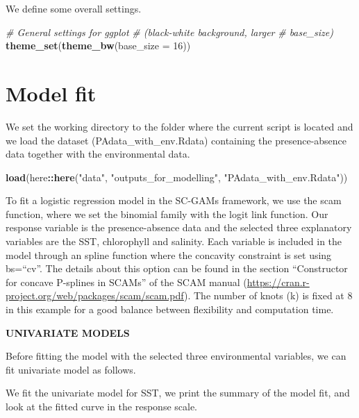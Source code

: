 \documentclass[
]{book}
\newenvironment{Shaded}{\begin{snugshade}}{\end{snugshade}}
\newcommand{\AttributeTok}[1]{\textcolor[rgb]{0.13,0.29,0.53}{#1}}
\newcommand{\CommentTok}[1]{\textcolor[rgb]{0.56,0.35,0.01}{\textit{#1}}}
\newcommand{\DecValTok}[1]{\textcolor[rgb]{0.00,0.00,0.81}{#1}}
\newcommand{\FunctionTok}[1]{\textcolor[rgb]{0.13,0.29,0.53}{\textbf{#1}}}
\newcommand{\NormalTok}[1]{#1}
\newcommand{\SpecialCharTok}[1]{\textcolor[rgb]{0.81,0.36,0.00}{\textbf{#1}}}
\newcommand{\StringTok}[1]{\textcolor[rgb]{0.31,0.60,0.02}{#1}}
\begin{document}
We define some overall settings.

\begin{Shaded}
\begin{Highlighting}[]
\CommentTok{\# General settings for ggplot}
\CommentTok{\# (black{-}white background, larger}
\CommentTok{\# base\_size)}
\FunctionTok{theme\_set}\NormalTok{(}\FunctionTok{theme\_bw}\NormalTok{(}\AttributeTok{base\_size =} \DecValTok{16}\NormalTok{))}
\end{Highlighting}
\end{Shaded}

\section{Model fit}\label{model-fit}

We set the working directory to the folder where the current script is located and we load the dataset (PAdata\_with\_env.Rdata) containing the presence-absence data together with the environmental data.

\begin{Shaded}
\begin{Highlighting}[]
\FunctionTok{load}\NormalTok{(here}\SpecialCharTok{::}\FunctionTok{here}\NormalTok{(}\StringTok{"data"}\NormalTok{, }\StringTok{"outputs\_for\_modelling"}\NormalTok{,}
    \StringTok{"PAdata\_with\_env.Rdata"}\NormalTok{))}
\end{Highlighting}
\end{Shaded}

To fit a logistic regression model in the SC-GAMs framework, we use the scam function, where we set the binomial family with the logit link function. Our response variable is the presence-absence data and the selected three explanatory variables are the SST, chlorophyll and salinity. Each variable is included in the model through an spline function where the concavity constraint is set using bs=``cv''. The details about this option can be found in the section ``Constructor for concave P-splines in SCAMs'' of the SCAM manual (\url{https://cran.r-project.org/web/packages/scam/scam.pdf}). The number of knots (k) is fixed at 8 in this example for a good balance between flexibility and computation time.

\textbf{UNIVARIATE MODELS}

Before fitting the model with the selected three environmental variables, we can fit univariate model as follows.

We fit the univariate model for SST, we print the summary of the model fit, and look at the fitted curve in the response scale.
\end{document}
